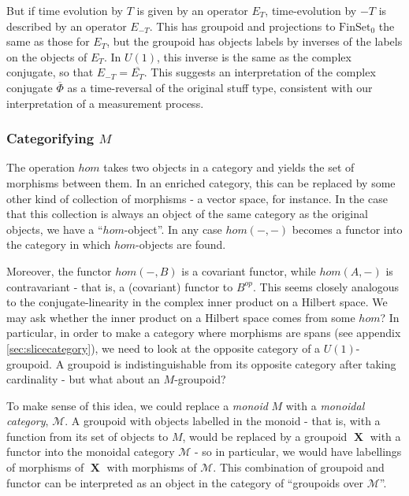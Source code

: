 \documentclass{amsart} \usepackage{amsmath,amssymb,bbm}
\newcommand{\opname}[1]{\operatorname{#1}}
\newcommand{\catname}[1]{\boldsymbol{\opname{{#1}}}}
\newcommand{\FSN}{\catname{FinSet_0}}
\begin{document}
But if time evolution by $T$ is given by an operator $E_T$,
time-evolution by $-T$ is described by an operator $E_{-T}$.  This has
groupoid and projections to $\FSN$ the same as those for $E_T$, but
the groupoid has objects labels by inverses of the labels on the
objects of $E_T$.  In $U(1)$, this inverse is the same as the complex
conjugate, so that $E_{-T}=\overline{E_T}$.  This suggests an
interpretation of the complex conjugate $\overline{\Phi}$ as a
time-reversal of the original stuff type, consistent with our
interpretation of a measurement process.

\subsubsection{Categorifying $M$}\label{sec:categorifyingM}

The operation $hom$ takes two objects in a category and yields the set
of morphisms between them.  In an enriched category, this can be
replaced by some other kind of collection of morphisms - a vector
space, for instance.  In the case that this collection is always an
object of the same category as the original objects, we have a
``$hom$-object''.  In any case $hom(-,-)$ becomes a functor into the
category in which $hom$-objects are found.

Moreover, the functor $hom(-,B)$ is a covariant functor, while
$hom(A,-)$ is contravariant - that is, a (covariant) functor to
$B^{op}$.  This seems closely analogous to the conjugate-linearity in
the complex inner product on a Hilbert space.  We may ask whether the
inner product on a Hilbert space comes from some $hom$?  In
particular, in order to make a category where morphisms are spans (see
appendix \ref{sec:slicecategory}), we need to look at the opposite
category of a $U(1)$-groupoid.  A groupoid is indistinguishable from
its opposite category after taking cardinality - but what about an
$M$-groupoid?

To make sense of this idea, we could replace a \textit{monoid} $M$
with a \textit{monoidal category}, $\mathcal{M}$. A groupoid with
objects labelled in the monoid - that is, with a function from its set
of objects to $M$, would be replaced by a groupoid $\catname{X}$ with
a functor into the monoidal category $\mathcal{M}$ - so in particular,
we would have labellings of morphisms of $\catname{X}$ with morphisms
of $\mathcal{M}$.  This combination of groupoid and functor can be
interpreted as an object in the category of ``groupoids over
$\mathcal{M}$''.
\end{document}
